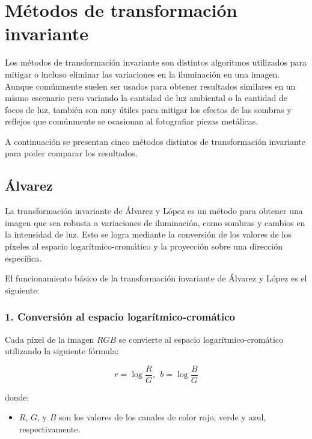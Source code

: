 \section{Métodos de transformación invariante}\label{metodos-de-transformación-invariante}

Los métodos de transformación invariante son distintos algoritmos utilizados para mitigar o incluso eliminar las variaciones en la iluminación en una imagen. Aunque comúnmente suelen ser usados para obtener resultados similares en un mismo escenario pero variando la cantidad de luz ambiental o la cantidad de focos de luz, también son muy útiles para mitigar los efectos de las sombras y reflejos que comúnmente se ocasionan al fotografiar piezas metálicas. 

A continuación se presentan cinco métodos distintos de transformación invariante para poder comparar los resultados.

\subsection{Álvarez}\label{alvarez}
La transformación invariante de Álvarez y López \cite{alvarez2011} es un método para obtener una imagen que sea robusta a variaciones de iluminación, como sombras y cambios en la intensidad de luz. Esto se logra mediante la conversión de los valores de los píxeles al espacio logarítmico-cromático y la proyección sobre una dirección específica.

El funcionamiento básico de la transformación invariante de Álvarez y López es el siguiente:

\subsubsection{1. Conversión al espacio logarítmico-cromático}

Cada píxel de la imagen $RGB$ se convierte al espacio logarítmico-cromático utilizando la siguiente fórmula:

$$r=\log \frac{R}{G},~~b=\log \frac{B}{G}$$

donde:

\begin{itemize}
\setlength{\itemsep}{-1ex}
   \item{\begin{flushleft} $R$, $G$, y $B$ son los valores de los canales de color rojo, verde y azul, respectivamente. \end{flushleft}}
\end{itemize}

